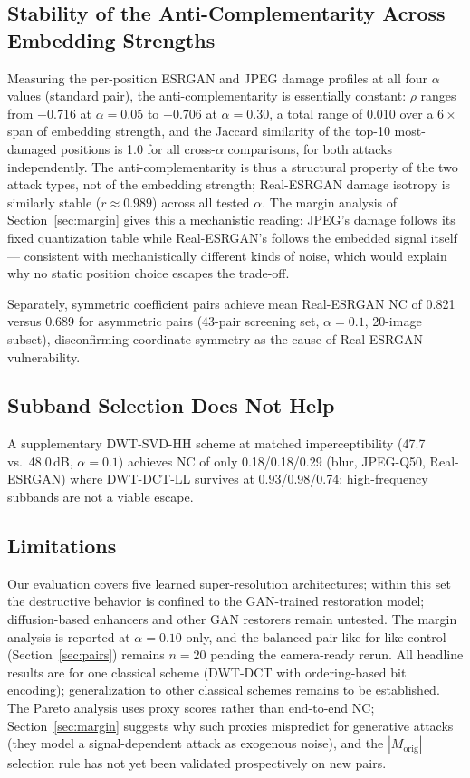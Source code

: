 \documentclass[conference]{IEEEtran}
\begin{document}
\subsection{Stability of the Anti-Complementarity Across Embedding Strengths}

Measuring the per-position ESRGAN and JPEG damage profiles at all four
$\alpha$ values (standard pair), the anti-complementarity is essentially
constant: $\rho$ ranges from $-0.716$ at $\alpha=0.05$ to $-0.706$ at
$\alpha=0.30$, a total range of 0.010 over a $6\times$ span of embedding
strength, and the Jaccard similarity of the top-10 most-damaged
positions is 1.0 for all cross-$\alpha$ comparisons, for both attacks
independently. The anti-complementarity is thus a structural property of
the two attack types, not of the embedding strength; Real-ESRGAN damage
isotropy is similarly stable ($r \approx 0.989$) across all tested
$\alpha$. The margin analysis of Section~\ref{sec:margin} gives this a
mechanistic reading: JPEG's damage follows its fixed quantization table
while Real-ESRGAN's follows the embedded signal itself --- consistent
with mechanistically different kinds of noise, which would explain why
no static position choice escapes the trade-off.

Separately, symmetric coefficient pairs achieve mean Real-ESRGAN NC of
0.821 versus 0.689 for asymmetric pairs (43-pair screening set,
$\alpha=0.1$, 20-image subset), disconfirming coordinate symmetry as
the cause of Real-ESRGAN vulnerability.

\subsection{Subband Selection Does Not Help}
A supplementary DWT-SVD-HH scheme at matched imperceptibility (47.7
vs.\ 48.0\,dB, $\alpha=0.1$) achieves NC of only 0.18/0.18/0.29 (blur,
JPEG-Q50, Real-ESRGAN) where DWT-DCT-LL survives at 0.93/0.98/0.74:
high-frequency subbands are not a viable escape.

\subsection{Limitations}
Our evaluation covers five learned super-resolution architectures;
within this set the destructive behavior is confined to the GAN-trained
restoration model; diffusion-based enhancers and other GAN restorers
remain untested. The margin analysis is reported at $\alpha=0.10$ only,
and the balanced-pair like-for-like control (Section~\ref{sec:pairs})
remains $n=20$ pending the camera-ready rerun.
All headline results are for one classical scheme (DWT-DCT with
ordering-based bit encoding); generalization to other classical schemes
remains to be established.
The Pareto analysis uses proxy scores rather than end-to-end NC;
Section~\ref{sec:margin} suggests why such proxies mispredict for
generative attacks (they model a signal-dependent attack as exogenous
noise), and the $|M_{\mathrm{orig}}|$ selection rule has not yet been
validated prospectively on new pairs.
\end{document}
